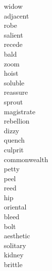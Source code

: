 \documentclass[b5paper, 11pt]{ctexart}
\begin{document}
\begin{multicols*}{3}
\begin{description}
\item[widow]

\item[adjacent]

\item[robe]

\item[salient]

\item[recede]

\item[bald]

\item[zoom]

\item[hoist]

\item[soluble]

\item[reassure]

\item[sprout]

\item[magistrate]

\item[rebellion]

\item[dizzy]

\item[quench]

\item[culprit]

\item[commonwealth]

\item[petty]

\item[peel]

\item[reed]

\item[hip]

\item[oriental]

\item[bleed]

\item[bolt]

\item[aesthetic]

\item[solitary]

\item[kidney]

\item[brittle]


\end{description}
\end{multicols*}
\end{document}
